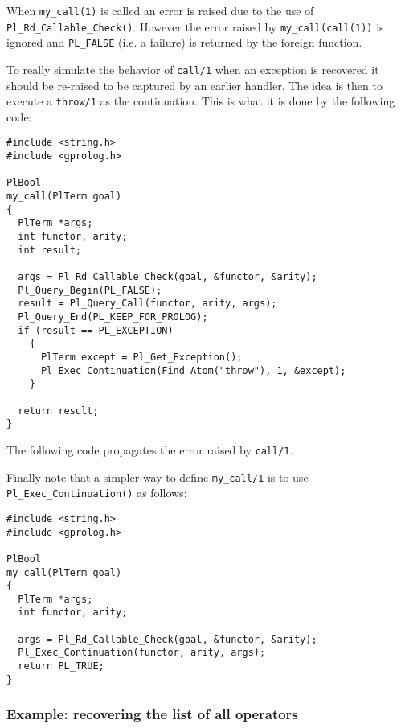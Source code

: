 When \texttt{my\_call(1)} is called an error is raised due to the use of
\texttt{Pl\_Rd\_Callable\_Check()}. However the error raised by
\texttt{my\_call(call(1))} is ignored and \texttt{PL\_FALSE} (i.e. a failure) is
returned by the foreign function.

To really simulate the behavior of \texttt{call/1} when an exception
is recovered it should be re-raised to be captured by an earlier
handler. The idea is then to execute a \texttt{throw/1} as the
continuation. This is what it is done by the following code:

\begin{Indentation}
\begin{verbatim}
#include <string.h>
#include <gprolog.h>

PlBool
my_call(PlTerm goal)
{
  PlTerm *args;
  int functor, arity;
  int result;

  args = Pl_Rd_Callable_Check(goal, &functor, &arity);
  Pl_Query_Begin(PL_FALSE);
  result = Pl_Query_Call(functor, arity, args);
  Pl_Query_End(PL_KEEP_FOR_PROLOG);
  if (result == PL_EXCEPTION)
    {
      PlTerm except = Pl_Get_Exception();
      Pl_Exec_Continuation(Find_Atom("throw"), 1, &except);
    }

  return result;
}
\end{verbatim}
\end{Indentation}

The following code propagates the error raised by \texttt{call/1}.

\begin{CodeTwoCols}
\end{CodeTwoCols}

Finally note that a simpler way to define \texttt{my\_call/1} is to use
\texttt{Pl\_Exec\_Continuation()} as follows:

\begin{Indentation}
\begin{verbatim}
#include <string.h>
#include <gprolog.h>

PlBool
my_call(PlTerm goal)
{
  PlTerm *args;
  int functor, arity;

  args = Pl_Rd_Callable_Check(goal, &functor, &arity);
  Pl_Exec_Continuation(functor, arity, args);
  return PL_TRUE;
}
\end{verbatim}
\end{Indentation}

\subsubsection{Example: recovering the list of all operators}

